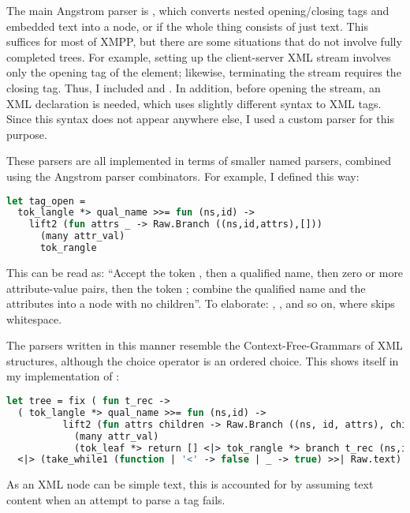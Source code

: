 \documentclass[12pt,a4paper,twoside,openright]{report}
\begin{document}
{The main Angstrom parser is , which converts nested opening/closing tags and embedded text into a  node, or  if the whole thing consists of just text. This suffices for most of XMPP, but there are some situations that do not involve fully completed trees. For example, setting up the client-server XML stream involves only the opening tag of the  element; likewise, terminating the stream requires the closing tag. Thus, I included  and . In addition, before opening the stream, an XML declaration  is needed, which uses slightly different syntax to XML tags. Since this syntax does not appear anywhere else, I used a custom parser for this purpose.

These parsers are all implemented in terms of smaller named parsers, combined using the Angstrom parser combinators. For example, I defined  this way:

\begin{lstlisting}[language=ml]
let tag_open =
  tok_langle *> qual_name >>= fun (ns,id) ->
    lift2 (fun attrs _ -> Raw.Branch ((ns,id,attrs),[]))
      (many attr_val)
      tok_rangle
\end{lstlisting}

This can be read as: ``Accept the token \code{<}, then a qualified name, then zero or more attribute-value pairs, then the token \code{>}; combine the qualified name and the attributes into a  node with no children''. To elaborate: , , and so on, where  skips whitespace.

The parsers written in this manner resemble the Context-Free-Grammars of XML structures, although the choice operator \code{<|>} is an ordered choice. This shows itself in my implementation of :

\begin{lstlisting}[language=ml]
let tree = fix ( fun t_rec ->
  ( tok_langle *> qual_name >>= fun (ns,id) ->
          lift2 (fun attrs children -> Raw.Branch ((ns, id, attrs), children))
            (many attr_val)
            (tok_leaf *> return [] <|> tok_rangle *> branch t_rec (ns,id)) )
  <|> (take_while1 (function | '<' -> false | _ -> true) >>| Raw.text) )
\end{lstlisting}

As an XML node can be simple text, this is accounted for by assuming text content when an attempt to parse a tag fails.

}
\end{document}
